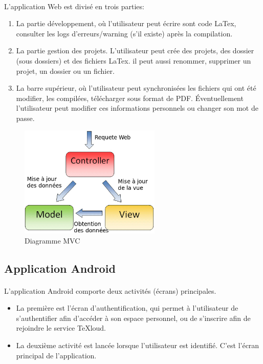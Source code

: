 \documentclass[a4paper,12pt]{article}
\begin{document}
\paragraph*{}
L'application Web est divisé en trois parties:
\begin{enumerate}
 \item La partie développement, où l'utilisateur peut écrire sont code LaTex, consulter les logs d'erreurs/warning (s'il existe) après la compilation.
 \item La partie gestion des projets. L'utilisateur peut crée des projets, des dossier (sous dossiers) et des fichiers LaTex. il peut aussi renommer, supprimer un projet, un dossier ou un fichier.
 \item La barre supérieur, où l'utilisateur peut synchronisées les fichiers qui ont été modifier, les compilées, télécharger sous format de PDF. Éventuellement l'utilisateur peut modifier ces informations personnels ou changer son mot de passe.
\end{enumerate}

\clearpage

\begin{figure}[!ht]
\begin{center}
  \includegraphics[width=0.6\textwidth]{./images/MVC.png}
\end{center}
  \caption{Diagramme MVC}
  \label{MVC}
\end{figure}

\subsection{Application Android}
\paragraph*{}
L'application Android comporte deux activités (écrans) principales.
\begin{itemize}
 \item La première est l'écran d'authentification, qui permet à l'utilisateur de s'authentifier afin d'accéder à son espace personnel, ou de s'inscrire afin de rejoindre le service TeXloud.
 \item La deuxième activité est lancée lorsque l'utilisateur est identifié. C'est l'écran principal de l'application.
\end{itemize}
\end{document}
